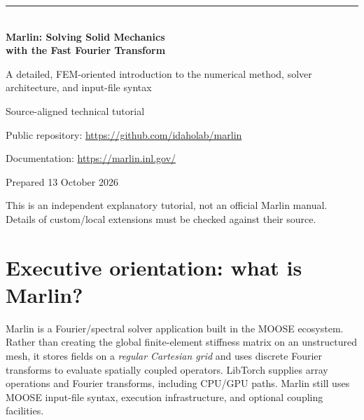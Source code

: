 \documentclass[11pt,a4paper]{article}
\begin{document}
\begin{titlepage}
\vspace*{20mm}
{\color{teal}\rule{\textwidth}{2.5pt}}\\[13mm]
{\Huge\bfseries\color{navy} Marlin: Solving Solid Mechanics\\[3mm] with the Fast Fourier Transform}\par
\vspace{11mm}
{\Large A detailed, FEM-oriented introduction to the numerical method, solver architecture, and input-file syntax}\par
\vspace{14mm}
\vfill
{\large Source-aligned technical tutorial}\par
{\normalsize Public repository: \url{https://github.com/idaholab/marlin}}\par
{\normalsize Documentation: \url{https://marlin.inl.gov/}}\par
{\normalsize Prepared 13 October 2026}\par
\vspace{5mm}
{\footnotesize This is an independent explanatory tutorial, not an official Marlin manual. Details of custom/local extensions must be checked against their source.}
\end{titlepage}
\tableofcontents
\clearpage
{}

\section{Executive orientation: what is Marlin?}
Marlin is a Fourier/spectral solver application built in the MOOSE ecosystem. Rather than creating the global finite-element stiffness matrix on an unstructured mesh, it stores fields on a \emph{regular Cartesian grid} and uses discrete Fourier transforms to evaluate spatially coupled operators. LibTorch supplies array operations and Fourier transforms, including CPU/GPU paths. Marlin still uses MOOSE input-file syntax, execution infrastructure, and optional coupling facilities.
\end{document}
